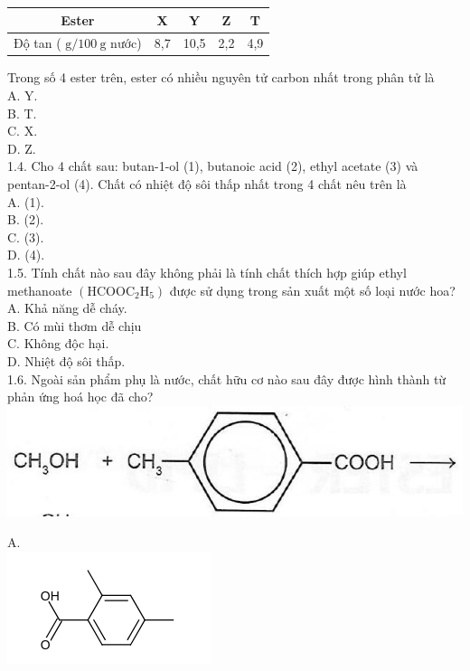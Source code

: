 \documentclass[10pt]{article}
\begin{document}
\begin{center}
\begin{tabular}{|c|c|c|c|c|}
\hline
Ester & X & Y & Z & T \\
\hline
Độ tan ( $\mathrm{g} / 100 \mathrm{~g}$ nước) & 8,7 & 10,5 & 2,2 & 4,9 \\
\hline
\end{tabular}
\end{center}

Trong số 4 ester trên, ester có nhiều nguyên tử carbon nhất trong phân tử là\\
A. Y.\\
B. T.\\
C. X.\\
D. Z.\\
1.4. Cho 4 chất sau: butan-1-ol (1), butanoic acid (2), ethyl acetate (3) và pentan-2-ol (4). Chất có nhiệt độ sôi thấp nhất trong 4 chất nêu trên là\\
A. (1).\\
B. (2).\\
C. (3).\\
D. (4).\\
1.5. Tính chất nào sau đây không phải là tính chất thích hợp giúp ethyl methanoate $\left(\mathrm{HCOOC}_{2} \mathrm{H}_{5}\right)$ được sử dụng trong sản xuất một số loại nước hoa?\\
A. Khả năng dễ cháy.\\
B. Có mùi thơm dễ chịu\\
C. Không độc hại.\\
D. Nhiệt độ sôi thấp.\\
1.6. Ngoài sản phẩm phụ là nước, chất hữu cơ nào sau đây được hình thành từ phản ứng hoá học đã cho?\\
\includegraphics[max width=\textwidth, center]{2025_10_23_de6f5713836e4e91b3c8g-002}

A.\\
\includegraphics{smile-a3243636d539d96d8d9955ae4d507a897c702a21}
\end{document}
